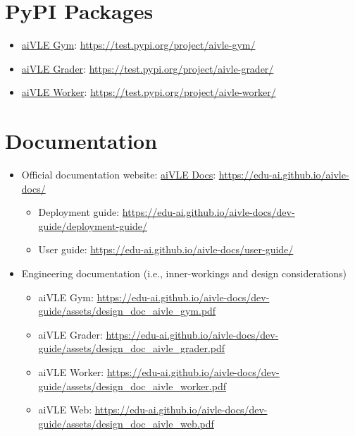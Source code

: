 \section{PyPI Packages}
\begin{itemize}
    \item \href{https://test.pypi.org/project/aivle-gym/}{aiVLE Gym}: \href{https://test.pypi.org/project/aivle-gym/}{https://test.pypi.org/project/aivle-gym/}
    \item \href{https://test.pypi.org/project/aivle-grader/}{aiVLE Grader}: \href{https://test.pypi.org/project/aivle-grader/}{https://test.pypi.org/project/aivle-grader/}
    \item \href{https://test.pypi.org/project/aivle-worker/}{aiVLE Worker}: \href{https://test.pypi.org/project/aivle-worker/}{https://test.pypi.org/project/aivle-worker/}
\end{itemize}

\section{Documentation}
\label{as:links-documentation}
\begin{itemize}
    \item Official documentation website: \href{https://edu-ai.github.io/aivle-docs/}{aiVLE Docs}: \href{https://edu-ai.github.io/aivle-docs/}{https://edu-ai.github.io/aivle-docs/}
    \begin{itemize}
        \item Deployment guide: \href{https://edu-ai.github.io/aivle-docs/dev-guide/deployment-guide/}{https://edu-ai.github.io/aivle-docs/dev-guide/deployment-guide/}
        \item User guide: \href{https://edu-ai.github.io/aivle-docs/user-guide/}{https://edu-ai.github.io/aivle-docs/user-guide/}
    \end{itemize}
    \item Engineering documentation (i.e., inner-workings and design considerations)
    \begin{itemize}
        \item aiVLE Gym: \href{https://edu-ai.github.io/aivle-docs/dev-guide/assets/design\_doc\_aivle\_gym.pdf}{https://edu-ai.github.io/aivle-docs/dev-guide/assets/design\_doc\_aivle\_gym.pdf}
        \item aiVLE Grader: \href{https://edu-ai.github.io/aivle-docs/dev-guide/assets/design\_doc\_aivle\_grader.pdf}{https://edu-ai.github.io/aivle-docs/dev-guide/assets/design\_doc\_aivle\_grader.pdf}
        \item aiVLE Worker: \href{https://edu-ai.github.io/aivle-docs/dev-guide/assets/design\_doc\_aivle\_worker.pdf}{https://edu-ai.github.io/aivle-docs/dev-guide/assets/design\_doc\_aivle\_worker.pdf}
        \item aiVLE Web: \href{https://edu-ai.github.io/aivle-docs/dev-guide/assets/design\_doc\_aivle\_web.pdf}{https://edu-ai.github.io/aivle-docs/dev-guide/assets/design\_doc\_aivle\_web.pdf}
    \end{itemize}
\end{itemize}
